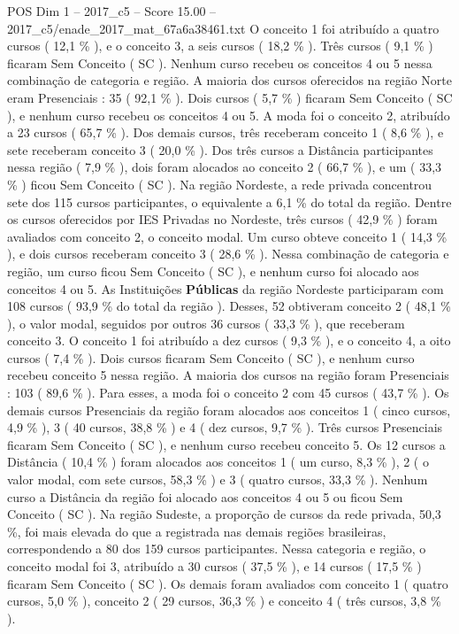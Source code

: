 \begin{textsample}{POS Dim 1 – 2017\_c5 – Score 15.00 – 2017\_c5/enade\_2017\_mat\_67a6a38461.txt}
O conceito 1 foi atribuído a quatro cursos ( 12,1 \% ), e o conceito 3, a seis cursos ( 18,2 \% ).
Três cursos ( 9,1 \% ) ficaram Sem Conceito ( SC ).
Nenhum curso recebeu os conceitos 4 ou 5 nessa combinação de categoria e região.
A maioria dos cursos oferecidos na região Norte eram Presenciais : 35 ( 92,1 \% ).
Dois cursos ( 5,7 \% ) ficaram Sem Conceito ( SC ), e nenhum curso recebeu os conceitos 4 ou 5.
A moda foi o conceito 2, atribuído a 23 cursos ( 65,7 \% ).
Dos demais cursos, três receberam conceito 1 ( 8,6 \% ), e sete receberam conceito 3 ( 20,0 \% ).
Dos três cursos a Distância participantes nessa região ( 7,9 \% ), dois foram alocados ao conceito 2 ( 66,7 \% ), e um ( 33,3 \% ) ficou Sem Conceito ( SC ).
Na região Nordeste, a rede privada concentrou sete dos 115 cursos participantes, o equivalente a 6,1 \% do total da região.
Dentre os cursos oferecidos por IES Privadas no Nordeste, três cursos ( 42,9 \% ) foram avaliados com conceito 2, o conceito modal.
Um curso obteve conceito 1 ( 14,3 \% ), e dois cursos receberam conceito 3 ( 28,6 \% ).
Nessa combinação de categoria e região, um curso ficou Sem Conceito ( SC ), e nenhum curso foi alocado aos conceitos 4 ou 5.
As Instituições \textbf{Públicas} da região Nordeste participaram com 108 cursos ( 93,9 \% do total da região ).
Desses, 52 obtiveram conceito 2 ( 48,1 \% ), o valor modal, seguidos por outros 36 cursos ( 33,3 \% ), que receberam conceito 3.
O conceito 1 foi atribuído a dez cursos ( 9,3 \% ), e o conceito 4, a oito cursos ( 7,4 \% ).
Dois cursos ficaram Sem Conceito ( SC ), e nenhum curso recebeu conceito 5 nessa região.
A maioria dos cursos na região foram Presenciais : 103 ( 89,6 \% ).
Para esses, a moda foi o conceito 2 com 45 cursos ( 43,7 \% ).
Os demais cursos Presenciais da região foram alocados aos conceitos 1 ( cinco cursos, 4,9 \% ), 3 ( 40 cursos, 38,8 \% ) e 4 ( dez cursos, 9,7 \% ).
Três cursos Presenciais ficaram Sem Conceito ( SC ), e nenhum curso recebeu conceito 5.
Os 12 cursos a Distância ( 10,4 \% ) foram alocados aos conceitos 1 ( um curso, 8,3 \% ), 2 ( o valor modal, com sete cursos, 58,3 \% ) e 3 ( quatro cursos, 33,3 \% ).
Nenhum curso a Distância da região foi alocado aos conceitos 4 ou 5 ou ficou Sem Conceito ( SC ).
Na região Sudeste, a proporção de cursos da rede privada, 50,3 \%, foi mais elevada do que a registrada nas demais regiões brasileiras, correspondendo a 80 dos 159 cursos participantes.
Nessa categoria e região, o conceito modal foi 3, atribuído a 30 cursos ( 37,5 \% ), e 14 cursos ( 17,5 \% ) ficaram Sem Conceito ( SC ).
Os demais foram avaliados com conceito 1 ( quatro cursos, 5,0 \% ), conceito 2 ( 29 cursos, 36,3 \% ) e conceito 4 ( três cursos, 3,8 \% ).

\end{textsample}
